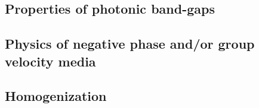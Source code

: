 

\subsection{Properties of photonic band-gaps}
\subsection{Physics of negative phase and/or group velocity media}


\subsection{Homogenization}



